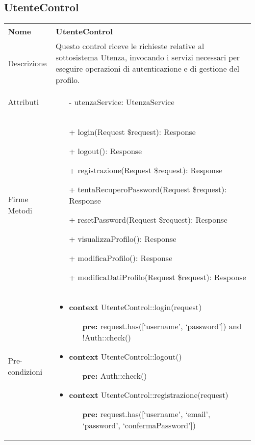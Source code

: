 \subsection{UtenteControl}
\small\begin{tabular}{|| l | p{28em} ||} 
	\hline
	Nome & UtenteControl\\
	\hline
	Descrizione & Questo control riceve le richieste relative al sottosistema Utenza, invocando i servizi necessari per eseguire operazioni di autenticazione e di gestione del profilo. \\
	\hline
	Attributi & \begin{itemize}
		\item[-] utenzaService: UtenzaService
	\end{itemize}\\
	\hline
	Firme Metodi & \begin{itemize}
		\item[+] login(Request \$request): Response
		\item[+] logout(): Response
		\item[+] registrazione(Request \$request): Response
		\item[+] tentaRecuperoPassword(Request \$request): Response
		\item[+] resetPassword(Request \$request): Response
		\item[+] visualizzaProfilo(): Response
		\item[+] modificaProfilo(): Response
		\item[+] modificaDatiProfilo(Request \$request): Response
	\end{itemize}\\
	\hline
	Pre-condizioni & \begin{itemize}
		\item \textbf{context} UtenteControl::login(request)
		\begin{itemize}
			\item[ ] \textbf{pre:} request.has([‘username’, ‘password’]) and !Auth::check()
		\end{itemize}
	  
	    \item \textbf{context} UtenteControl::logout()
		\begin{itemize}
			\item[ ] \textbf{pre:} Auth::check()
		\end{itemize} 
	  
	    \item \textbf{context} UtenteControl::registrazione(request) 
		\begin{itemize}
			\item[ ] \textbf{pre:} request.has([‘username’, ‘email’, ‘password’, ‘confermaPassword’])
		\end{itemize} 
	  

\end{itemize}
\end{tabular}

